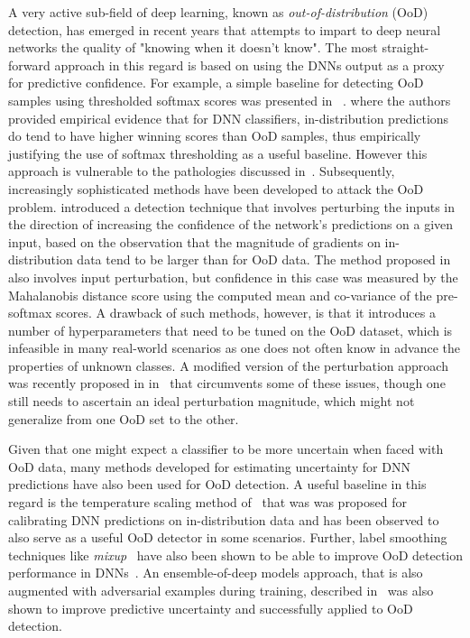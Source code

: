 \documentclass[accepted]{uai2021} \pdfoutput=1
\begin{document}
A very active sub-field of  deep learning, known as  \textit{out-of-distribution} (OoD) detection,
has emerged in recent years that attempts to impart  to deep  neural networks the quality of  "knowing when it doesn't know".   
The most straight-forward approach in this regard is based on using the DNNs output as a proxy for predictive confidence. For example, a simple baseline for detecting OoD samples using thresholded softmax scores was presented in ~\cite{hendrycks2016baseline}. 
where the authors provided empirical evidence that for DNN classifiers, in-distribution predictions do tend to have higher winning scores than OoD samples, thus empirically justifying the use of softmax thresholding as a useful baseline. However this approach is vulnerable to the pathologies discussed in~\cite{nguyen2015deep}.  Subsequently, increasingly sophisticated methods have been developed to attack the OoD problem. \cite{liangenhancing} introduced a detection technique that involves perturbing the inputs in the direction of increasing the confidence of the network's predictions on a given input, based on the observation that the magnitude of gradients on in-distribution data tend to be larger than for OoD data. 
The method proposed in ~\cite{lee2018simple} also involves input perturbation, but confidence in this case was measured by the Mahalanobis distance score using the computed mean and co-variance of the pre-softmax scores.  A drawback of such methods, however, is that it introduces  a number of hyperparameters that need to be tuned on the OoD dataset, which is infeasible in many real-world scenarios as one  does not often know in advance the properties of unknown classes. A modified version of the perturbation approach was recently proposed in in~\cite{hsu2020generalized} that circumvents some of these issues, though one still needs to ascertain an ideal perturbation magnitude, which might not generalize from one OoD set to the other.
 
Given that one might expect a classifier to be more uncertain when faced with OoD data,  many methods developed for estimating uncertainty for DNN predictions have also been used for OoD detection. A useful baseline in this regard is the temperature scaling method of~\cite{guo2017calibration} that was was proposed for calibrating DNN predictions on in-distribution data and has been observed to also serve as a useful OoD detector in some scenarios. Further, label smoothing  techniques like \textit{mixup}~\cite{zhang2017mixup} have also been shown to be able to improve OoD detection performance in DNNs~\cite{thulasidasan2019mixup}.
An ensemble-of-deep models approach, that is also augmented with adversarial examples during training, described in~\cite{lakshminarayanan2017simple} was also shown to improve predictive uncertainty and successfully applied to OoD detection.
\end{document}
